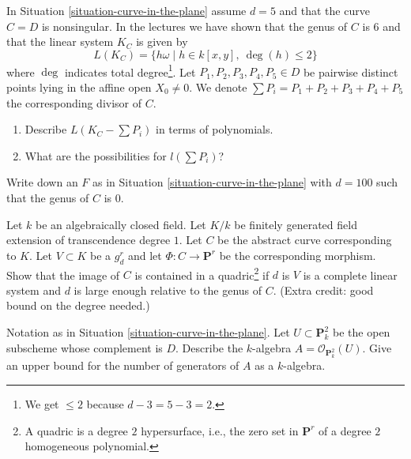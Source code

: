 \begin{exercise}
\label{exercise-smooth-plane-curve-linear-system}
In Situation \ref{situation-curve-in-the-plane} assume $d = 5$
and that the curve $C = D$ is nonsingular. In the lectures we have shown
that the genus of $C$ is $6$ and that the linear system $K_C$ is given by
$$
L(K_C) = \{h\omega \mid h \in k[x, y],\ \deg(h) \leq 2\}
$$
where $\deg$ indicates total degree\footnote{We get $\leq 2$ because
$d - 3 = 5 - 3 = 2$.}. Let $P_1, P_2, P_3, P_4, P_5 \in D$
be pairwise distinct points lying in the affine open $X_0 \not = 0$. We denote
$\sum P_i = P_1 + P_2 + P_3 + P_4 + P_5$ the corresponding divisor of $C$.
\begin{enumerate}
\item Describe $L(K_C - \sum P_i)$ in terms of polynomials.
\item What are the possibilities for $l(\sum P_i)$?
\end{enumerate}
\end{exercise}

\begin{exercise}
\label{exercise-rational-curve-high-degree}
Write down an $F$ as in Situation \ref{situation-curve-in-the-plane}
with $d = 100$ such that the genus of $C$ is $0$.
\end{exercise}

\begin{exercise}
\label{exercise-high-degree-curve-quadratic-equation}
Let $k$ be an algebraically closed field. Let $K/k$ be
finitely generated field extension of transcendence degree $1$.
Let $C$ be the abstract curve corresponding to $K$.
Let $V \subset K$ be a $g^r_d$ and let $\Phi : C \to \mathbf{P}^r$
be the corresponding morphism. Show that the image of $C$
is contained in a quadric\footnote{A quadric is a degree $2$ hypersurface,
i.e., the zero set in $\mathbf{P}^r$ of a degree $2$ homogeneous
polynomial.} if $d$ is $V$ is a complete linear
system and $d$ is large enough relative to the genus of $C$.
(Extra credit: good bound on the degree needed.)
\end{exercise}

\begin{exercise}
\label{exercise-surjective-map-a2-p2}
Notation as in Situation \ref{situation-curve-in-the-plane}.
Let $U \subset \mathbf{P}^2_k$ be the open subscheme
whose complement is $D$. Describe the $k$-algebra
$A = \mathcal{O}_{\mathbf{P}^2_k}(U)$. Give an upper bound for the
number of generators of $A$ as a $k$-algebra.
\end{exercise}



